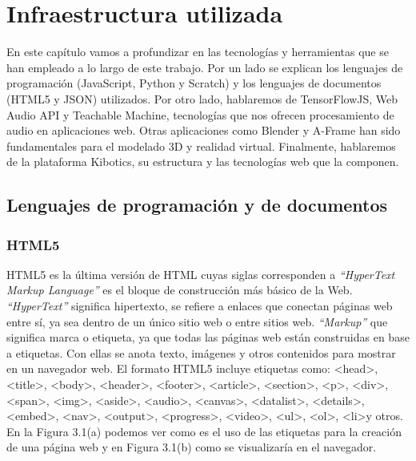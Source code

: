 \chapter{Infraestructura utilizada}
\label{infraestructura}
En este capítulo vamos a profundizar en las tecnologías y herramientas que se han empleado a lo largo de este trabajo. Por un lado se explican los lenguajes de programación (JavaScript, Python y Scratch) y los lenguajes de documentos (HTML5 y JSON)  utilizados. Por otro lado, hablaremos de TensorFlowJS, Web Audio API y Teachable Machine, tecnologías que nos ofrecen procesamiento de audio en aplicaciones web. Otras aplicaciones como Blender y A-Frame han sido fundamentales para el  modelado 3D y realidad virtual. Finalmente, hablaremos de la plataforma Kibotics, su estructura y las tecnologías web que la componen.
\section{Lenguajes de programación y de documentos}
\subsection{HTML5}
HTML5 es la última versión de HTML cuyas siglas corresponden a \textit{``HyperText Markup Language''} es el bloque de construcción más básico de la Web\cite{html}. \textit{``HyperText''} significa hipertexto, se refiere a enlaces que conectan páginas web entre sí, ya sea dentro de un único sitio web o entre sitios web. 
\textit{``Markup''} que significa marca o etiqueta, ya que todas las páginas web están construidas en base a etiquetas. Con ellas se anota texto, imágenes y otros contenidos para mostrar en un navegador web. El formato HTML5 incluye etiquetas como:  \textless head\textgreater, \textless title\textgreater, \textless body\textgreater, \textless header\textgreater, \textless footer\textgreater, \textless article\textgreater, \textless section\textgreater, \textless p\textgreater, \textless div\textgreater, \textless span\textgreater, \textless img\textgreater, \textless aside\textgreater, \textless audio\textgreater, \textless canvas\textgreater, \textless datalist\textgreater, \textless details\textgreater, \textless embed\textgreater, \textless nav\textgreater, \textless output\textgreater, \textless progress\textgreater, \textless video\textgreater, \textless ul\textgreater, \textless ol\textgreater, \textless li\textgreater  y otros. En la Figura 3.1(a) podemos ver como es el uso de las etiquetas para la creación de una página web y en Figura 3.1(b) como se visualizaría en el navegador.

